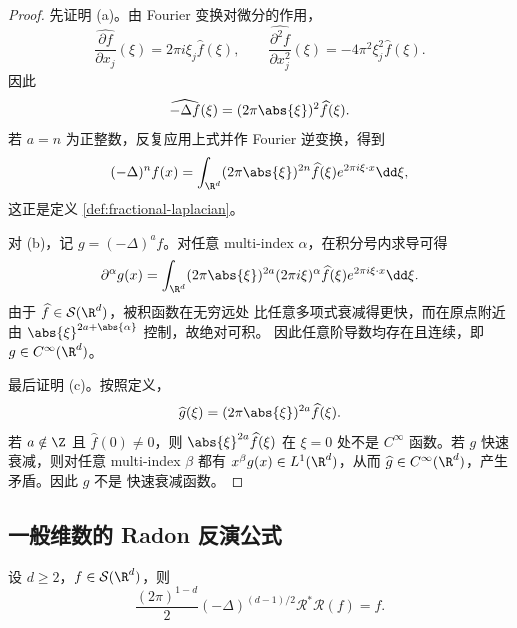 \begin{proof}
	先证明 (a)。由 Fourier 变换对微分的作用，
	\[
	\widehat{\frac{\partial f}{\partial x_j}}(\xi)
	=2\pi i\xi_j\widehat f(\xi),
	\qquad
	\widehat{\frac{\partial^2f}{\partial x_j^2}}(\xi)
	=-4\pi^2\xi_j^2\widehat f(\xi).
	\]
	因此
	\[
	\widehat{-\Delta f}(\xi)
	=(2\pi\abs{\xi})^2\widehat f(\xi).
	\]
	若 $a=n$ 为正整数，反复应用上式并作 Fourier 逆变换，得到
	\[
	(-\Delta)^n f(x)
	=\int_{\R^d}(2\pi\abs{\xi})^{2n}
	\widehat f(\xi)e^{2\pi i\xi\cdot x}\dd\xi,
	\]
	这正是定义 \ref{def:fractional-laplacian}。

	对 (b)，记 $g=(-\Delta)^a f$。对任意 multi-index
	$\alpha$，在积分号内求导可得
	\[
	\partial^\alpha g(x)
	=\int_{\R^d}(2\pi\abs{\xi})^{2a}
	(2\pi i\xi)^\alpha\widehat f(\xi)
	e^{2\pi i\xi\cdot x}\dd\xi.
	\]
	由于 $\widehat f\in\mathcal S(\R^d)$，被积函数在无穷远处
	比任意多项式衰减得更快，而在原点附近由
	$\abs{\xi}^{2a+\abs{\alpha}}$ 控制，故绝对可积。
	因此任意阶导数均存在且连续，即 $g\in C^\infty(\R^d)$。

	最后证明 (c)。按照定义，
	\[
	\widehat g(\xi)
	=(2\pi\abs{\xi})^{2a}\widehat f(\xi).
	\]
	若 $a\notin\Z$ 且 $\widehat f(0)\neq0$，则
	$\abs{\xi}^{2a}\widehat f(\xi)$ 在 $\xi=0$ 处不是
	$C^\infty$ 函数。若 $g$ 快速衰减，则对任意 multi-index
	$\beta$ 都有 $x^\beta g(x)\in L^1(\R^d)$，从而
	$\widehat g\in C^\infty(\R^d)$，产生矛盾。因此 $g$ 不是
	快速衰减函数。
\end{proof}

\subsection*{一般维数的 Radon 反演公式}

\begin{theorem}\label{thm:radon-inversion-rd}
	设 $d\geq2$，$f\in\mathcal S(\R^d)$，则
	\[
	\frac{(2\pi)^{1-d}}{2}
	(-\Delta)^{(d-1)/2}\mathcal R^*\mathcal R(f)
	=f.
	\]
\end{theorem}

